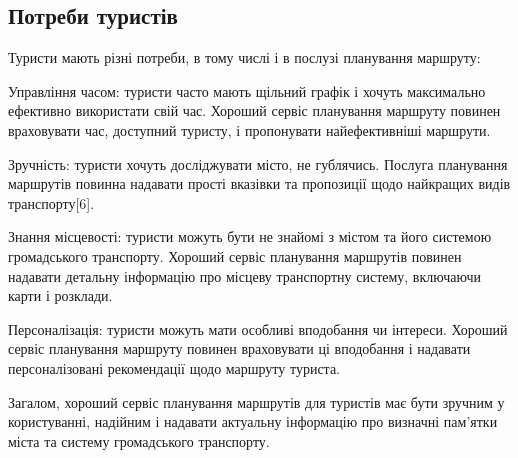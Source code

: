 \subsection{Потреби туристів}
\label{subsec:tourists-needs-subsection}

Туристи мають різні потреби, в тому числі і в послузі планування маршруту:

Управління часом: туристи часто мають щільний графік і хочуть максимально ефективно використати свій час. Хороший сервіс планування маршруту повинен враховувати час, доступний туристу, і пропонувати найефективніші маршрути.

Зручність: туристи хочуть досліджувати місто, не гублячись. Послуга планування маршрутів повинна надавати прості вказівки та пропозиції щодо найкращих видів транспорту[6].

Знання місцевості: туристи можуть бути не знайомі з містом та його системою громадського транспорту. Хороший сервіс планування маршрутів повинен надавати детальну інформацію про місцеву транспортну систему, включаючи карти і розклади.

Персоналізація: туристи можуть мати особливі вподобання чи інтереси. Хороший сервіс планування маршруту повинен враховувати ці вподобання і надавати персоналізовані рекомендації щодо маршруту туриста.

Загалом, хороший сервіс планування маршрутів для туристів має бути зручним у користуванні, надійним і надавати актуальну інформацію про визначні пам'ятки міста та систему громадського транспорту.